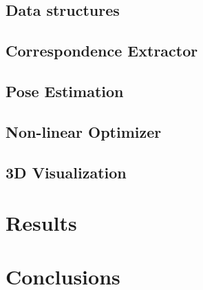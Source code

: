 \documentclass[10pt, a4paper, twoside]{article}
\numberwithin{equation}{subsection}
\numberwithin{figure}{section}
\numberwithin{table}{section}
\begin{document}
\newpage
\subsection{Data structures}
\label{sec:data_structures}


\newpage
\subsection{Correspondence Extractor}
\label{sec:point_extractor}


\newpage
\subsection{Pose Estimation}
\label{sec:pose_estimator}


\newpage
\subsection{Non-linear Optimizer}
\label{sec:nonlin_optimizer}


\newpage
\subsection{3D Visualization}
\label{sec:3d_visualization}


\newpage
\section{Results}
\label{sec:results}


\newpage
\section{Conclusions}
\label{sec:conclusions}

\newpage
%
%

\thispagestyle{fancy}
\mbox{}
\newpage




%
\end{document}
